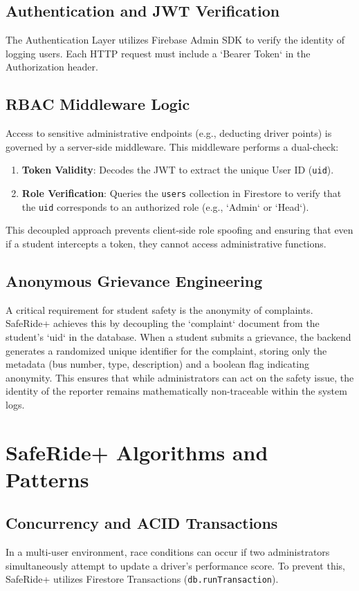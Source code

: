\documentclass[conference]{IEEEtran}
\begin{document}
\subsection{Authentication and JWT Verification}
The Authentication Layer utilizes Firebase Admin SDK to verify the identity of logging users. Each HTTP request must include a `Bearer Token` in the Authorization header.

\subsection{RBAC Middleware Logic}
Access to sensitive administrative endpoints (e.g., deducting driver points) is governed by a server-side middleware. This middleware performs a dual-check:
\begin{enumerate}
    \item \textbf{Token Validity}: Decodes the JWT to extract the unique User ID (\texttt{uid}).
    \item \textbf{Role Verification}: Queries the \texttt{users} collection in Firestore to verify that the \texttt{uid} corresponds to an authorized role (e.g., `Admin` or `Head`).
\end{enumerate}
This decoupled approach prevents client-side role spoofing and ensuring that even if a student intercepts a token, they cannot access administrative functions.

\subsection{Anonymous Grievance Engineering}
A critical requirement for student safety is the anonymity of complaints. SafeRide+ achieves this by decoupling the `complaint` document from the student's `uid` in the database. When a student submits a grievance, the backend generates a randomized unique identifier for the complaint, storing only the metadata (bus number, type, description) and a boolean flag indicating anonymity. This ensures that while administrators can act on the safety issue, the identity of the reporter remains mathematically non-traceable within the system logs.

\section{SafeRide+ Algorithms and Patterns}

\subsection{Concurrency and ACID Transactions}
In a multi-user environment, race conditions can occur if two administrators simultaneously attempt to update a driver's performance score. To prevent this, SafeRide+ utilizes Firestore Transactions (\texttt{db.runTransaction}). 
\end{document}
